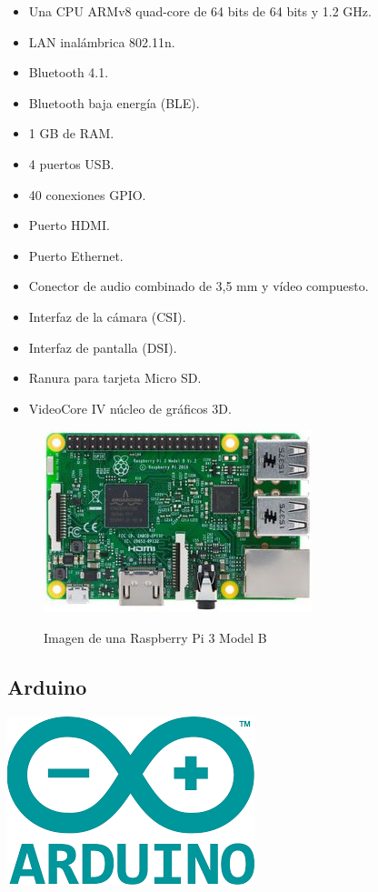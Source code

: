 \begin{itemize}
 \item Una CPU ARMv8 quad-core de 64 bits de 64 bits y 1.2 GHz.
 \item LAN inalámbrica 802.11n.
 \item Bluetooth 4.1.
 \item Bluetooth baja energía (BLE).
 \item 1 GB de RAM.
 \item 4 puertos USB.
 \item 40 conexiones GPIO.
 \item Puerto HDMI.
 \item Puerto Ethernet.
 \item Conector de audio combinado de 3,5 mm y vídeo compuesto.
 \item Interfaz de la cámara (CSI).
 \item Interfaz de pantalla (DSI).
 \item Ranura para tarjeta Micro SD.
 \item VideoCore IV núcleo de gráficos 3D. 
\end{itemize}


\begin{figure}[H]
  \begin{center}
    \includegraphics[scale=0.6]{imagenes/raspberry-pi.jpg}\\
    \caption{Imagen de una Raspberry Pi 3 Model B}
  \end{center}
\end{figure}


\subsection{ Arduino }

\begin{center}
\includegraphics[scale=0.6]{imagenes/arduino_logo.png}
\end{center}

